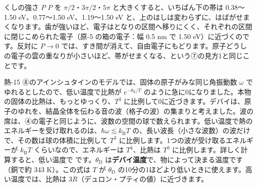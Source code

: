 \begin{phbaisuru}[大きく]{くしの強さ $P$}
$P$ を $\pi/2$・$3\pi/2$・$5\pi$ と大きくすると、いちばん下の帯は 0.38〜1.50 eV、0.77〜1.50 eV、1.19〜1.50 eV と、上のはしは変わらずに、はばがせまくなります。歯が強いほど、電子はとなりの区間へ移りにくく、それぞれの区間に閉じこめられた電子（原-5 の箱の電子：幅 0.5 nm で 1.50 eV）に近づくのです。反対に $P\to0$ では、すき間が消えて、自由電子にもどります。原子どうしの電子の雲の重なりが小さいほど、帯がせまくなる、という⑦の見方1と同じことです。
\end{phbaisuru}

熱-15 ⑧のアインシュタインのモデルでは、固体の原子がみな同じ角振動数 $\omega$ でゆれるとしたので、低い温度で比熱が $e^{-\theta_{\mathrm E}/T}$ のように急に0になりました。本物の固体の比熱は、もっとゆっくり、$T^3$ に比例して0に近づきます。デバイは、原子のゆれを、結晶全体を伝わる音の波（格子の波）の集まりと考えました。波の席は、④の電子と同じように、波数の空間の球で数えられます。低い温度で熱のエネルギーを受け取れるのは、$\hbar\omega\lesssim k_{\mathrm B}T$ の、長い波長（小さな波数）の波だけで、その数は球の体積に比例して $T^3$ に比例します。1つの波が受け取るエネルギーが $k_{\mathrm B}T$ くらいなので、エネルギーは $T^4$、比熱は $T^3$ に比例します。詳しく計算すると、低い温度で
\label{ph:原-8:debye}です。$\theta_{\mathrm D}$ は\textbf{デバイ温度}で、物によって決まる温度です（銅で約 343 K）。この式は $T$ が $\theta_{\mathrm D}$ の10分の1ほどより低いときに使えます。高い温度では、比熱は $3R$（デュロン・プティの値）に近づきます。

